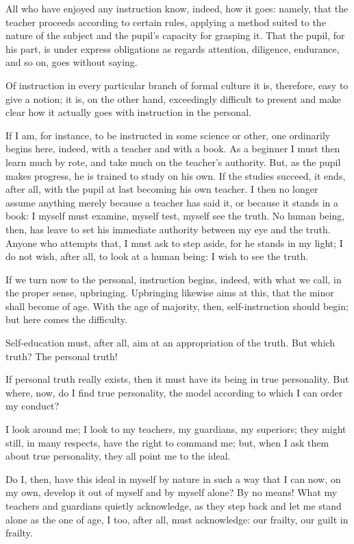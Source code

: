 \documentclass[12pt,a4paper]{book}
\begin{document}
All who have enjoyed any instruction know, indeed, how it goes: namely, that the teacher proceeds according to certain rules, applying a method suited to the nature of the subject and the pupil's capacity for grasping it. That the pupil, for his part, is under express obligations as regards attention, diligence, endurance, and so on, goes without saying.

Of instruction in every particular branch of formal culture it is, therefore, easy to give a notion; it is, on the other hand, exceedingly difficult to present and make clear how it actually goes with instruction in the personal.

If I am, for instance, to be instructed in some science or other, one ordinarily begins here, indeed, with a teacher and with a book. As a beginner I must then learn much by rote, and take much on the teacher's authority. But, as the pupil makes progress, he is trained to study on his own. If the studies succeed, it ends, after all, with the pupil at last becoming his own teacher. I then no longer assume anything merely because a teacher has said it, or because it stands in a book: I myself must examine, myself test, myself see the truth. No human being, then, has leave to set his
immediate authority between my eye and the truth. Anyone who attempts that, I must ask to step aside, for he stands in my light; I do not wish, after all, to look at a human being: I wish to see the truth.

If we turn now to the personal, instruction begins, indeed, with what we call, in the proper sense, upbringing. Upbringing likewise aims at this, that the minor shall become of age. With the age of majority, then, self-instruction should begin; but here comes the difficulty.

Self-education must, after all, aim at an appropriation of the truth. But which truth? The personal truth!

If personal truth really exists, then it must have its being in true personality. But where, now, do I find true personality, the model according to which I can order my conduct?

I look around me; I look to my teachers, my guardians, my superiors; they might still, in many respects, have the right to command me; but, when I ask them about true personality, they all point me to the ideal.

Do I, then, have this ideal in myself by nature in such a way that I can now, on my own, develop it out of myself and by myself alone? By no means! What my teachers and guardians quietly acknowledge, as they step back and let me stand alone as the one of age, I too, after all, must acknowledge: our frailty, our guilt in frailty.
\end{document}
